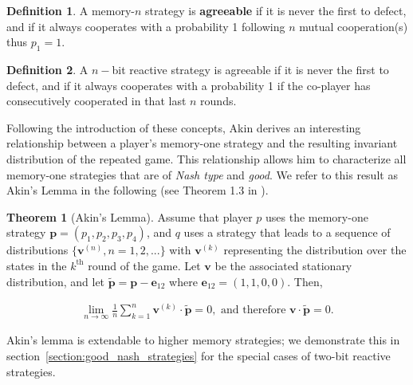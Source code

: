 \documentclass{article}
\theoremstyle{definition}
\newtheorem{definition}{Definition}[section]
\newtheorem{theorem}{Theorem}[section]
\begin{document}
\begin{definition}\label{definition:memn_agreeable}
  A memory-\(n\) strategy is \textbf{agreeable} if it is never the first to defect,
  and if it always cooperates with a probability 1 following \(n\) mutual cooperation(s) thus
  \(p_1=1\).
\end{definition}

\begin{definition}\label{definition:nbit_agreeable} A \(n-\)bit reactive strategy is
agreeable if it is never the first to defect,
and if it always cooperates with a probability 1 if the co-player has consecutively cooperated in that last \(n\) rounds.
\end{definition}

Following the introduction of these concepts, Akin derives an interesting relationship between 
a player's memory-one strategy and the resulting invariant distribution of the repeated game. 
This relationship allows him to characterize all memory-one strategies that are of \textit{Nash type} and \textit{good}. 
We refer to this result as Akin's Lemma in the following (see Theorem 1.3 in \citep{akin:EGADS:2016}).

\begin{theorem}[Akin's Lemma]\label{theorem:akin}
  Assume that player \(p\) uses the memory-one strategy \(\mathbf{p}=(p_1, p_2, p_3, p_4)\),
  and \(q\) uses a strategy that leads to a sequence
  of distributions \(\{\mathbf{v}^{(n)}, n = 1, 2, ...\}\) with \(\mathbf{v}^{(k)}\) representing the
  distribution over the states in the \(k^{\text{th}}\) round of the game. 
  Let   \(\mathbf{v}\) be the associated stationary distribution, and let \(\mathbf{\tilde{p}} = \mathbf{p} \!- \!\mathbf{e}_{12}\) where
  \(\mathbf{e}_{12} = (1, 1, 0, 0)\). Then,

  \begin{align}
    \lim_{n \rightarrow \infty} \frac{1}{n} \sum_{k=1}^{n} \mathbf{v}^{(k)} \cdot \mathbf{\tilde{p}} = 0, \text{ and therefore } \mathbf{v} \cdot \mathbf{\tilde{p}} = 0.
  \end{align}
\end{theorem}

Akin's lemma is extendable to higher memory strategies; we demonstrate this in section~\ref{section:good_nash_strategies}
for the special cases of two-bit reactive strategies.
\end{document}
